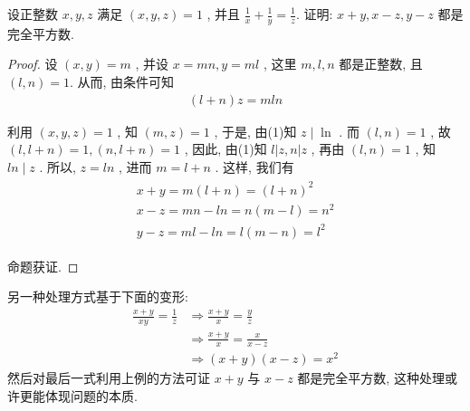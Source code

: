 \begin{example}
	设正整数 $x ,  y ,  z$ 满足 $(x, y, z)=1$ , 并且 $\frac{1}{x}+\frac{1}{y}=\frac{1}{z}$. 证明:  $x+y ,  x-z ,  y-z$ 都是完全平方数.
\end{example}
\begin{proof}
	设 $(x, y)=m$ , 并设 $x=m n, y=m l$ , 这里 $m ,  l ,  n$ 都是正整数, 且 $(l, n)=1$. 从而, 由条件可知
	\begin{align*}
		(l+n) z=m l n
	\end{align*}

	利用 $(x, y, z)=1$ , 知 $(m, z)=1$ , 于是, 由(1)知 $z \mid \ln$ . 而 $(l, n)=1$ , 故 $(l, l+n)=1,(n, l+n)=1$ , 因此, 由(1)知 $l|z, n| z$ , 再由 $(l, n)=1$ , 知 $l n \mid z$ . 所以,  $z=l n$ , 进而 $m=l+n$ . 这样, 我们有
	\begin{align*}
		\begin{gathered}
			x+y=m(l+n)=(l+n)^{2} \\
			x-z=m n-l n=n(m-l)=n^{2} \\
			y-z=m l-l n=l(m-n)=l^{2}
		\end{gathered}
	\end{align*}

	命题获证.
\end{proof}
\begin{note}
	另一种处理方式基于下面的变形:
	\begin{align}
		\frac{x+y}{x y}=\frac{1}{z} & \Rightarrow \frac{x+y}{x}=\frac{y}{z}   \\
		                            & \Rightarrow \frac{x+y}{x}=\frac{x}{x-z} \\
		                            & \Rightarrow(x+y)(x-z)=x^{2}
	\end{align}
	然后对最后一式利用上例的方法可证 $x+y$ 与 $x-z$ 都是完全平方数, 这种处理或许更能体现问题的本质.
\end{note}

